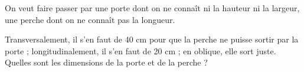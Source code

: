\documentclass[exercice]{thedocument}%
\begin{document}
%
On veut faire passer par une porte dont on ne connaît ni la hauteur ni la
largeur, une perche dont on ne connaît pas la longueur.\par
Transversalement, il s'en faut de 40 cm pour que la perche ne puisse sortir
par la porte ; longitudinalement, il s'en faut de 20 cm ; en oblique, elle
sort juste.\vskip20pt
Quelles sont les dimensions de la porte
et de la perche ?
\end{document}
